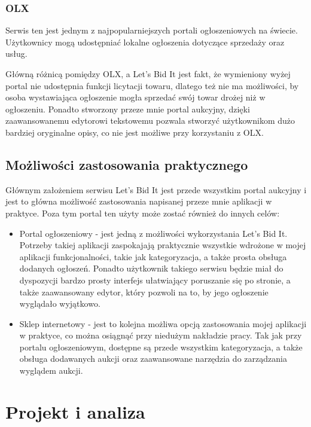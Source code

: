 \documentclass[brudnopis]{xmgr}
\begin{document}
\subsection{OLX}  

Serwis ten jest jednym z najpopularniejszych portali ogłoszeniowych na świecie. Użytkownicy
mogą udostępniać lokalne ogłoszenia dotyczące sprzedaży oraz usług.

Główną różnicą pomiędzy OLX, a Let's Bid It jest fakt,
że wymieniony wyżej portal nie udostępnia funkcji licytacji towaru, dlatego też nie ma możliwości, by osoba wystawiająca ogłoszenie mogła sprzedać swój towar drożej niż w ogłoszeniu. Ponadto stworzony przeze mnie portal aukcyjny, dzięki zaawansowanemu edytorowi tekstowemu pozwala stworzyć użytkownikom dużo bardziej oryginalne opisy, co nie jest możliwe przy korzystaniu z OLX.

\section{Możliwości zastosowania praktycznego}
Głównym założeniem serwisu Let's Bid It jest przede wszystkim portal aukcyjny i jest to główna możliwość zastosowania napisanej przeze mnie aplikacji w praktyce. Poza tym portal ten użyty może zostać również do innych celów:

\begin{itemize}

\item Portal ogłoszeniowy - jest jedną z możliwości wykorzystania Let's Bid It. Potrzeby takiej aplikacji zaspokajają praktycznie wszystkie wdrożone w mojej aplikacji funkcjonalności, takie jak kategoryzacja, a także prosta obsługa dodanych ogłoszeń. Ponadto użytkownik takiego  serwisu będzie miał do dyspozycji bardzo prosty interfejs ułatwiający poruszanie się po stronie, a także zaawansowany edytor, który pozwoli na to, by jego ogłoszenie wyglądało wyjątkowo.

\item Sklep internetowy - jest to kolejna możliwa opcją zastosowania mojej aplikacji w praktyce, co można osiągnąć przy niedużym nakładzie pracy. Tak jak przy portalu ogłoszeniowym, dostępne są przede wszystkim kategoryzacja, a także obsługa dodawanych aukcji oraz zaawansowane narzędzia do zarządzania wyglądem aukcji.

\end{itemize}

\chapter{Projekt i analiza}
\end{document}
